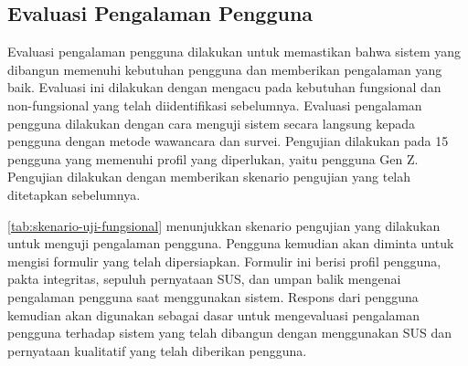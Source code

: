 \subsection{Evaluasi Pengalaman Pengguna}
\label{subsec:evaluasi-pengalaman-pengguna}
Evaluasi pengalaman pengguna dilakukan untuk memastikan bahwa sistem yang dibangun memenuhi kebutuhan pengguna dan memberikan pengalaman yang baik. Evaluasi ini dilakukan dengan mengacu pada kebutuhan fungsional dan non-fungsional yang telah diidentifikasi sebelumnya. Evaluasi pengalaman pengguna dilakukan dengan cara menguji sistem secara langsung kepada pengguna dengan metode wawancara dan survei. Pengujian dilakukan pada 15 pengguna yang memenuhi profil yang diperlukan, yaitu pengguna Gen Z. Pengujian dilakukan dengan memberikan skenario pengujian yang telah ditetapkan sebelumnya. 

\autoref{tab:skenario-uji-fungsional} menunjukkan skenario pengujian yang dilakukan untuk menguji pengalaman pengguna. Pengguna kemudian akan diminta untuk mengisi formulir yang telah dipersiapkan. Formulir ini berisi profil pengguna, pakta integritas, sepuluh pernyataan SUS, dan umpan balik mengenai pengalaman pengguna saat menggunakan sistem. Respons dari pengguna kemudian akan digunakan sebagai dasar untuk mengevaluasi pengalaman pengguna terhadap sistem yang telah dibangun dengan menggunakan SUS dan pernyataan kualitatif yang telah diberikan pengguna.